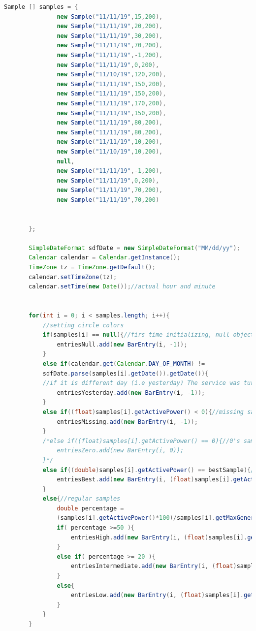 \begin{lstlisting}[language= Java, frame=single]
       Sample [] samples = {
               new Sample("11/11/19",15,200),
               new Sample("11/11/19",20,200),
               new Sample("11/11/19",30,200),
               new Sample("11/11/19",70,200),
               new Sample("11/11/19",-1,200),
               new Sample("11/11/19",0,200),
               new Sample("11/10/19",120,200),
               new Sample("11/11/19",150,200),
               new Sample("11/11/19",150,200),
               new Sample("11/11/19",170,200),
               new Sample("11/11/19",150,200),
               new Sample("11/11/19",80,200),
               new Sample("11/11/19",80,200),
               new Sample("11/11/19",10,200),
               new Sample("11/10/19",10,200),
               null,
               new Sample("11/11/19",-1,200),
               new Sample("11/11/19",0,200),
               new Sample("11/11/19",70,200),
               new Sample("11/11/19",70,200)


       };

       SimpleDateFormat sdfDate = new SimpleDateFormat("MM/dd/yy");
       Calendar calendar = Calendar.getInstance();
       TimeZone tz = TimeZone.getDefault();
       calendar.setTimeZone(tz);
       calendar.setTime(new Date());//actual hour and minute


       for(int i = 0; i < samples.length; i++){
           //setting circle colors
           if(samples[i] == null){//firs time initializing, null objects
               entriesNull.add(new BarEntry(i, -1));
           }
           else if(calendar.get(Calendar.DAY_OF_MONTH) != 
           sdfDate.parse(samples[i].getDate()).getDate()){
           //if it is different day (i.e yesterday) The service was turned off
               entriesYesterday.add(new BarEntry(i, -1));
           }
           else if((float)samples[i].getActivePower() < 0){//missing samples
               entriesMissing.add(new BarEntry(i, -1));
           }
           /*else if((float)samples[i].getActivePower() == 0){//0's samples
               entriesZero.add(new BarEntry(i, 0));
           }*/
           else if((double)samples[i].getActivePower() == bestSample){//best samples
               entriesBest.add(new BarEntry(i, (float)samples[i].getActivePower()));
           }
           else{//regular samples
               double percentage = 
               (samples[i].getActivePower()*100)/samples[i].getMaxGeneration();
               if( percentage >=50 ){
                   entriesHigh.add(new BarEntry(i, (float)samples[i].getActivePower()));
               }
               else if( percentage >= 20 ){
                   entriesIntermediate.add(new BarEntry(i, (float)samples[i].getActivePower()));
               }
               else{
                   entriesLow.add(new BarEntry(i, (float)samples[i].getActivePower()));
               }
           }
       }



\end{lstlisting}
